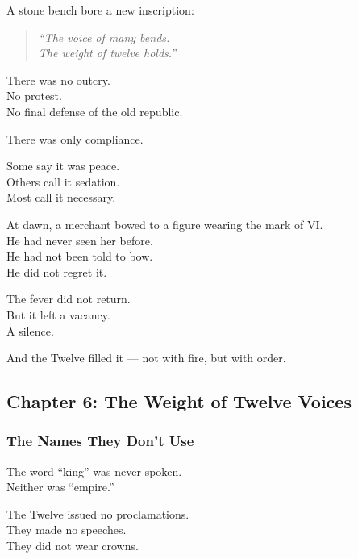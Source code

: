 \documentclass[12pt]{article}
\begin{document}
A stone bench bore a new inscription:

\begin{quote}
\textit{“The voice of many bends.}\\
\textit{The weight of twelve holds.”}
\end{quote}

\vspace{1em}

There was no outcry.\\
No protest.\\
No final defense of the old republic.

There was only compliance.

Some say it was peace.\\
Others call it sedation.\\
Most call it necessary.

\vspace{1em}

At dawn, a merchant bowed to a figure wearing the mark of VI.\\
He had never seen her before.\\
He had not been told to bow.\\
He did not regret it.

\vspace{1em}

The fever did not return.\\
But it left a vacancy.\\
A silence.

And the Twelve filled it — not with fire, but with order.

\newpage

\subsection*{Chapter 6: The Weight of Twelve Voices}

\vspace{.5in}

\subsubsection*{The Names They Don’t Use}

The word “king” was never spoken.\\
Neither was “empire.”

The Twelve issued no proclamations.\\
They made no speeches.\\
They did not wear crowns.
\end{document}
